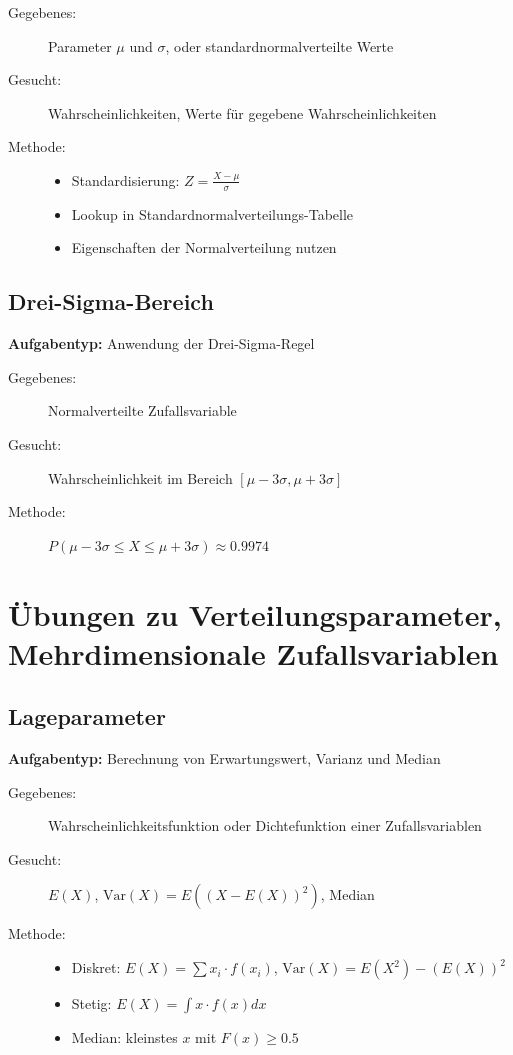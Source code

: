 \documentclass[12pt, a4paper, titlepage, ngerman]{scrartcl}
\begin{document}
\begin{description}
  \item[Gegebenes:] Parameter $\mu$ und $\sigma$, oder standardnormalverteilte Werte
  \item[Gesucht:] Wahrscheinlichkeiten, Werte für gegebene Wahrscheinlichkeiten
  \item[Methode:] 
    \begin{itemize}
      \item Standardisierung: $Z = \frac{X - \mu}{\sigma}$
      \item Lookup in Standardnormalverteilungs-Tabelle
      \item Eigenschaften der Normalverteilung nutzen
    \end{itemize}
\end{description}

\subsection{Drei-Sigma-Bereich}

\textbf{Aufgabentyp:} Anwendung der Drei-Sigma-Regel

\begin{description}
  \item[Gegebenes:] Normalverteilte Zufallsvariable
  \item[Gesucht:] Wahrscheinlichkeit im Bereich $[\mu - 3\sigma, \mu + 3\sigma]$
  \item[Methode:] $P(\mu - 3\sigma \leq X \leq \mu + 3\sigma) \approx 0.9974$
\end{description}

\section{Übungen zu Verteilungsparameter, Mehrdimensionale Zufallsvariablen}

\subsection{Lageparameter}

\textbf{Aufgabentyp:} Berechnung von Erwartungswert, Varianz und Median

\begin{description}
  \item[Gegebenes:] Wahrscheinlichkeitsfunktion oder Dichtefunktion einer Zufallsvariablen
  \item[Gesucht:] $E(X)$, $\text{Var}(X) = E((X - E(X))^2)$, Median
  \item[Methode:] 
    \begin{itemize}
      \item Diskret: $E(X) = \sum x_i \cdot f(x_i)$, $\text{Var}(X) = E(X^2) - (E(X))^2$
      \item Stetig: $E(X) = \int x \cdot f(x) dx$
      \item Median: kleinstes $x$ mit $F(x) \geq 0.5$
    \end{itemize}
\end{description}
\end{document}
